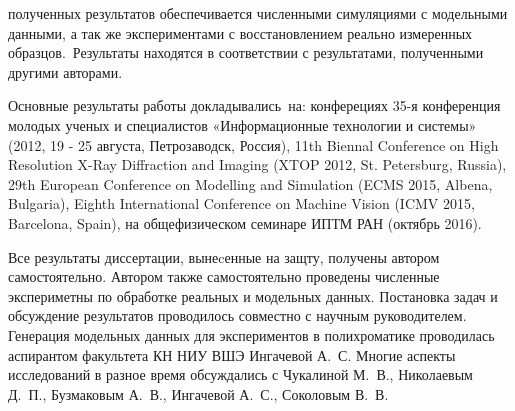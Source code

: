 {\reliability} полученных результатов обеспечивается численными симуляциями с модельными данными, а так же экспериментами с восстановлением реально измеренных образцов.\ Результаты находятся в соответствии с результатами, полученными другими авторами.


{\probation}
Основные результаты работы докладывались~на: конферециях 
35-я конференция молодых ученых и специалистов «Информационные технологии и системы» (2012, 19 - 25 августа, Петрозаводск, Россия),
11th Biennal Conference on High Resolution X-Ray Diffraction and Imaging (XTOP 2012, St. Petersburg, Russia), 
29th European Conference on Modelling and Simulation (ECMS 2015, Albena, Bulgaria),
Eighth International Conference on Machine Vision (ICMV 2015, Barcelona, Spain),
на общефизическом семинаре ИПТМ РАН (октябрь 2016).

{\contribution} Все результаты диссертации, вынеcенные на защту, получены автором самостоятельно. Автором также самостоятельно проведены численные экспериметны по обработке реальных и модельных данных. Постановка задач и обсуждение результатов проводилось совместно с научным руководителем. Генерация модельных данных для экспериментов в полихроматике проводилась аспирантом факультета КН НИУ ВШЭ Ингачевой А.~С. Многие аспекты исследований в разное время обсуждались с Чукалиной М.~В., Николаевым Д.~П., Бузмаковым А.~В., Ингачевой А.~С., Соколовым В.~В.


